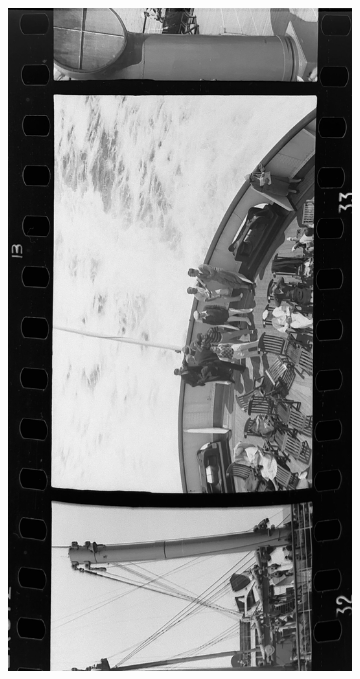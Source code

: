 \begin{figure}[H]
\begin{subfigure}{0.24\textwidth}
        \includegraphics[width=\linewidth]{Illustrations/P8.jpg}
        \caption{}
    \end{subfigure}    \begin{subfigure}{0.24\textwidth}

\end{subfigure}
\end{figure}
